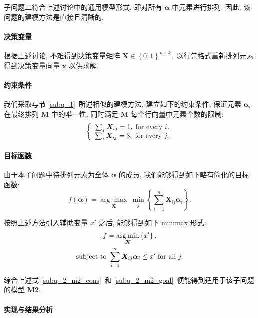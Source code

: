\documentclass[]{ctexart}
\begin{document}
子问题二符合上述讨论中的通用模型形式, 即对所有 $\bm{\alpha}$ 中元素进行排列. 因此, 该问题的建模方法是直接且清晰的.

\paragraph{决策变量} 根据上述讨论, 不难得到决策变量矩阵 $\bm{X} \in \left\{0,1\right\}^{n \times k},$ 以行先格式重新排列元素得到决策变量向量 $\bm{x}$ 以供求解.

\paragraph{约束条件} 我们采取与节 \ref{subq_1}\ 所述相似的建模方法, 建立如下的约束条件, 保证元素 $\bm{\alpha}_i$ 在最终排列 $\bm{M}$ 中的唯一性, 同时满足 $\bm{M}$ 每个行向量中元素个数的限制:
\begin{equation}
    \left\{
    \begin{array}{ll}
        \sum_{j} \bm{X}_{ij} = 1, \thickspace \text{for every}\ i,\\
        \sum_{i} \bm{X}_{ij} = 3, \thickspace \text{for every}\ j.\\
    \end{array}
    \right.
    \label{subq_2_m2_cons}
\end{equation}

\paragraph{目标函数} 由于本子问题中待排列元素为全体 $\bm{\alpha}$ 的成员, 我们能够得到如下略有简化的目标函数:
\begin{equation}
    f(\bm{\alpha}) = \underset{\bm{X}}{\arg\max}\ \underset{j}{\min} \left\{\sum_{i=1}^{n} \bm{X}_{ij}\bm{\alpha}_{i}\right\}.
    \label{subq_2_m2_goal}
\end{equation}

按照上述方法引入辅助变量 $x'$ 之后, 能够得到如下 minimax 形式:
\begin{gather*}
f = \underset{\bm{X}}{\arg\min} \left\{x'\right\}, \\
\text{subject to}\ \sum_{i=1}^{n} \bm{X}_{ij}\bm{\alpha}_{i} \le x' \thickspace \text{for all}\ j.
\end{gather*}

综合上述式 \eqref{subq_2_m2_cons}\ 和 \eqref{subq_2_m2_goal}\ 便能得到适用于该子问题的模型 \textbf{M2}.

\paragraph{实现与结果分析}
\end{document}
